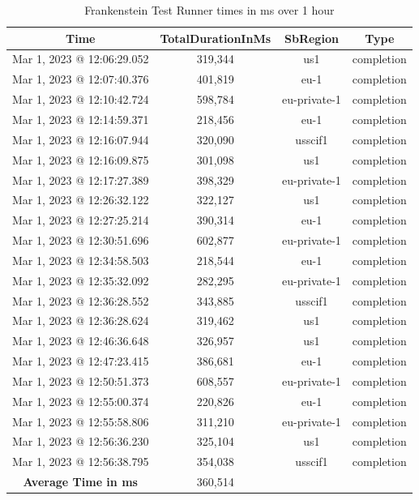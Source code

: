 \documentclass[12pt,a4paper,titlepage]{report}
\begin{document}
 \begin{table}[H]
  \centering
  \begin{tabular}{|c|c|c|c|}
  \hline \textbf
  \textbf{Time} & \textbf{TotalDurationInMs} & \textbf{SbRegion} & \textbf{Type} \\
  \hline 
  Mar 1, 2023 @ 12:06:29.052 & 319,344 & us1 & completion \\
  Mar 1, 2023 @ 12:07:40.376 & 401,819 & eu-1 & completion \\
  Mar 1, 2023 @ 12:10:42.724 & 598,784 & eu-private-1 & completion \\
  Mar 1, 2023 @ 12:14:59.371 & 218,456 & eu-1 & completion \\
  Mar 1, 2023 @ 12:16:07.944 & 320,090 & usscif1 & completion \\
  Mar 1, 2023 @ 12:16:09.875 & 301,098 & us1 & completion \\
  Mar 1, 2023 @ 12:17:27.389 & 398,329 & eu-private-1 & completion \\
  Mar 1, 2023 @ 12:26:32.122 & 322,127 & us1 & completion \\
  Mar 1, 2023 @ 12:27:25.214 & 390,314 & eu-1 & completion \\
  Mar 1, 2023 @ 12:30:51.696 & 602,877 & eu-private-1 & completion \\
  Mar 1, 2023 @ 12:34:58.503 & 218,544 & eu-1 & completion \\
  Mar 1, 2023 @ 12:35:32.092 & 282,295 & eu-private-1 & completion \\
  Mar 1, 2023 @ 12:36:28.552 & 343,885 & usscif1 & completion \\
  Mar 1, 2023 @ 12:36:28.624 & 319,462 & us1 & completion \\
  Mar 1, 2023 @ 12:46:36.648 & 326,957 & us1 & completion \\
  Mar 1, 2023 @ 12:47:23.415 & 386,681 & eu-1 & completion \\
  Mar 1, 2023 @ 12:50:51.373 & 608,557 & eu-private-1 & completion \\
  Mar 1, 2023 @ 12:55:00.374 & 220,826 & eu-1 & completion \\
  Mar 1, 2023 @ 12:55:58.806 & 311,210 & eu-private-1 & completion \\
  Mar 1, 2023 @ 12:56:36.230 & 325,104 & us1 & completion \\
  Mar 1, 2023 @ 12:56:38.795 & 354,038 & usscif1 & completion \\
  \hline
  \textbf{Average Time in ms} & 360,514 & & \\
  \hline
  \end{tabular}
  \caption{Frankenstein Test Runner times in ms over 1 hour}
  \label{tab:frank}
  \end{table}
\end{document}
